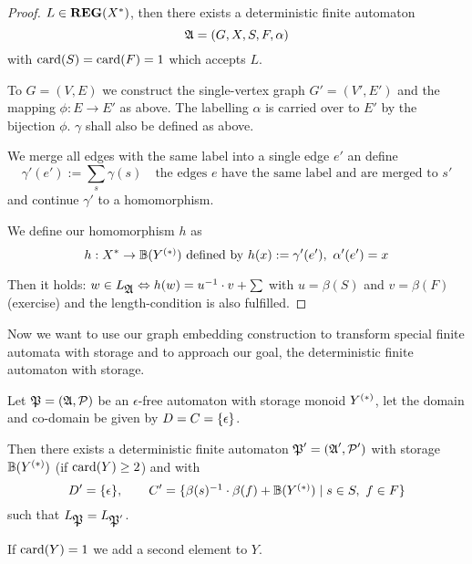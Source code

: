 \begin{proof}
$L \in \mbox{{\bf REG}}(X^*)$, then there exists a deterministic finite automaton
\[ \mbox{$\mathfrak{A}$} = (G, X, S, F, \alpha) \]
with $\mathrm{card}({S}) = \mathrm{card}({F}) = 1$ which accepts $L$.

To $G = (V, E)$ we construct the single-vertex graph $G' = (V', E')$ and the
mapping $\phi:
E \to E'$ as above. The labelling $\alpha$ is carried over to $E'$ by the
bijection $\phi$. $\gamma$ shall also be defined as above.

We merge all edges with the same label into a single edge $e'$ an define
\[ \gamma'(e') := \sum_{s} \gamma(s) \quad\text{the edges $e$ have the same
label and are merged to $s'$} \]
and continue $\gamma'$ to a homomorphism.

We define our homomorphism $h$ as
\[ h: X^* \to \mathbb{B}(\mbox{${Y}^{(*)}$})\text{ defined by }h(x) := \gamma'(e'),\
\alpha'(e') = x \]

Then it holds: $w \in L_{\mbox{$\mathfrak{A}$}} \Leftrightarrow h(w) = u^{-1} \cdot v + \sum$
with $u = \beta(S)$ and $v = \beta(F)$ (exercise) and the length-condition is
also fulfilled.
\end{proof}

\bigskip
Now we want to use our graph embedding construction to transform special finite
automata with storage and to approach our goal, the deterministic finite
automaton with storage.

\begin{theorem}
Let $\mbox{$\mathfrak{P}$} = (\mbox{$\mathfrak{A}$}, \mbox{$\mathcal{P}$})$ be an $\epsilon$-free automaton with
storage monoid $\mbox{${Y}^{(*)}$}$, let the domain and co-domain be given by $D = C
= \mbox{$\{\epsilon\}$}$.

Then there exists a deterministic finite automaton $\mbox{$\mathfrak{P}$}' = (\mbox{$\mathfrak{A}$}', \mbox{$\mathcal{P}$}')$
with storage $\mathbb{B}(\mbox{${Y}^{(*)}$})$ (if $\mathrm{card}({Y}) \geq 2$) and with
\[ D' = \mbox{$\{\epsilon\}$},\qquad C' = \mbox{$\{\beta(s)^{-1} \cdot \beta(f) +
\mathbb{B}(\mbox{${Y}^{(*)}$}) \mid s\in S,\ f\in F\}$} \]
such that $L_{\mbox{$\mathfrak{P}$}} = L_{\mbox{$\mathfrak{P}$}'}$.

If $\mathrm{card}({Y}) = 1$ we add a second element to $Y$.
\end{theorem}

